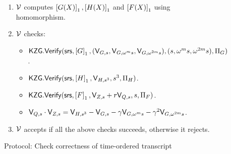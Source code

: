 \begin{figure}[htbp]
\begin{mdframed}
{\begin{enumerate}[leftmargin=1em, label=\arabic*.]
\begin{itemize}[leftmargin=1em]
            \end{itemize}
            \item $\verifier$ computes $\gone{G(X)},\gone{H(X)}$ and $\gone{F(X)}$ using homomorphism.
            \item $\verifier$ checks:
            \begin{itemize}[leftmargin=1em]
                \item $\kzgverify(\srs,\gone{G}, (\val{s}{G}, \val{\omega^m s}{G}, \val{\omega^{2m} s}{G}),\\(s,\omega^m s, \omega^{2m}s),\Pi_G)$.
                \item $\kzgverify(\srs,\gone{H}, \val{s^3}{H}, s^3, \Pi_H)$.
                \item $\kzgverify(\srs,\gone{F}, \val{s}{Z} + r\val{s}{Q}, s, \Pi_F)$.
                \item $\val{s}{Q}\cdot \val{s}{Z} = \val{s^3}{H}-\val{s}{G}-\gamma \val{\omega^m s}{G}-\gamma^2\val{\omega^{2m}s}{G}$.
            \end{itemize}
            \item $\verifier$ accepts if all the above checks succeeds, otherwise it rejects.
        \end{enumerate}
    }
    \end{mdframed}
    \caption{Protocol: Check correctness of time-ordered transcript}
    \label{fig:time-ordered-transcript}
\end{figure}

